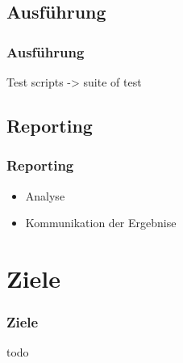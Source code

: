 \subsection{Ausf\"uhrung}
\begin{frame}
	\frametitle{Ausf\"uhrung}
	Test scripts -> suite of test
\end{frame}

\subsection{Reporting}
\begin{frame}
	\frametitle{Reporting}
	\begin{itemize}
		\item Analyse
		\item Kommunikation der Ergebnise
	\end{itemize}
\end{frame}

\section{Ziele}
\begin{frame}
	\frametitle{Ziele}
	todo
\end{frame}

